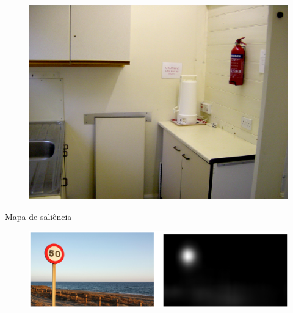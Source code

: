\documentclass[10pt]{beamer}
\begin{document}
\begin{frame}{}
    \begin{figure}
        \centering
        \includegraphics[width=0.9\linewidth]{./img/fire_extinguisher.jpg}
    \end{figure}
\end{frame}

\begin{frame}{Mapa de saliência}
    \begin{figure}
        \centering
        \includegraphics[width=1.0\linewidth]{./img/saliency_map_ex_1.png}
    \end{figure}
\end{frame}
\end{document}
